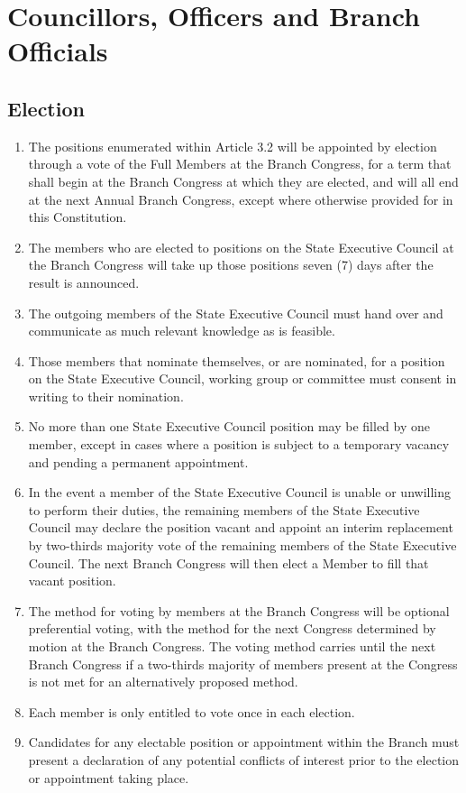 \documentclass[a4paper,titlepage,8.5pt]{article}
\newcommand{\stateorterritory}{State}
\begin{document}
\section{Councillors, Officers and Branch Officials}

\subsection{Election}

\begin{enumerate}
\item The positions enumerated within Article 3.2 will be appointed by election through a vote of the Full Members at the Branch Congress, for a term that shall begin at the Branch Congress at which they are elected, and will all end at the next Annual Branch Congress, except where otherwise provided for in this Constitution.
\item The members who are elected to positions on the {\stateorterritory} Executive Council at the Branch Congress will take up those positions seven (7) days after the result is announced.
\item The outgoing members of the {\stateorterritory} Executive Council must hand over and communicate as much relevant knowledge as is feasible.
\item Those members that nominate themselves, or are nominated, for a position on the {\stateorterritory} Executive Council, working group or committee must consent in writing to their nomination.
\item No more than one {\stateorterritory} Executive Council position may be filled by one member, except in cases where a position is subject to a temporary vacancy and pending a permanent appointment.
\item In the event a member of the {\stateorterritory} Executive Council is unable or unwilling to perform their duties, the remaining members of the {\stateorterritory} Executive Council may declare the position vacant and appoint an interim replacement by two-thirds majority vote of the remaining members of the {\stateorterritory} Executive Council. The next Branch Congress will then elect a Member to fill that vacant position.
\item The method for voting by members at the Branch Congress will be optional preferential voting, with the method for the next Congress determined by motion at the Branch Congress. The voting method carries until the next Branch Congress if a two-thirds majority of members present at the Congress is not met for an alternatively proposed method.
\item Each member is only entitled to vote once in each election.
\item Candidates for any electable position or appointment within the Branch must present a declaration of any potential conflicts of interest prior to the election or appointment taking place.
\end{enumerate}
\end{document}
